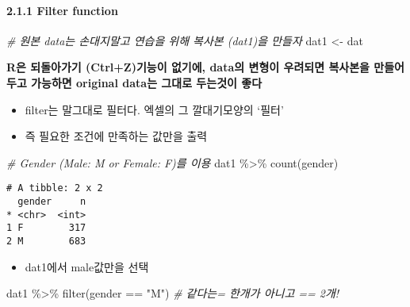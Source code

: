 \documentclass[
]{article}
\newenvironment{Shaded}{\begin{snugshade}}{\end{snugshade}}
\newcommand{\CommentTok}[1]{\textcolor[rgb]{0.56,0.35,0.01}{\textit{#1}}}
\newcommand{\FunctionTok}[1]{\textcolor[rgb]{0.00,0.00,0.00}{#1}}
\newcommand{\NormalTok}[1]{#1}
\newcommand{\OtherTok}[1]{\textcolor[rgb]{0.56,0.35,0.01}{#1}}
\newcommand{\SpecialCharTok}[1]{\textcolor[rgb]{0.00,0.00,0.00}{#1}}
\newcommand{\StringTok}[1]{\textcolor[rgb]{0.31,0.60,0.02}{#1}}
\providecommand{\tightlist}{%
  \setlength{\itemsep}{0pt}\setlength{\parskip}{0pt}}
\begin{document}
\hypertarget{filter-function}{%
\paragraph{2.1.1 Filter function}\label{filter-function}}

\begin{Shaded}
\begin{Highlighting}[]
\CommentTok{\# 원본 data는 손대지말고 연습을 위해 복사본 (dat1)을 만들자}
\NormalTok{dat1 }\OtherTok{\textless{}{-}}\NormalTok{ dat}
\end{Highlighting}
\end{Shaded}

\textbf{R은 되돌아가기 (Ctrl+Z)기능이 없기에, data의 변형이 우려되면
복사본을 만들어두고 가능하면 original data는 그대로 두는것이 좋다 }

\begin{itemize}
\tightlist
\item
  filter는 말그대로 필터다. 엑셀의 그 깔대기모양의 `필터'
\item
  즉 필요한 조건에 만족하는 값만을 출력
\end{itemize}

\begin{Shaded}
\begin{Highlighting}[]
\CommentTok{\# Gender (Male: M or Female: F)를 이용}
\NormalTok{dat1 }\SpecialCharTok{\%\textgreater{}\%} 
  \FunctionTok{count}\NormalTok{(gender)}
\end{Highlighting}
\end{Shaded}

\begin{verbatim}
# A tibble: 2 x 2
  gender     n
* <chr>  <int>
1 F        317
2 M        683
\end{verbatim}

\begin{itemize}
\tightlist
\item
  dat1에서 male값만을 선택
\end{itemize}

\begin{Shaded}
\begin{Highlighting}[]
\NormalTok{dat1 }\SpecialCharTok{\%\textgreater{}\%} 
   \FunctionTok{filter}\NormalTok{(gender }\SpecialCharTok{==} \StringTok{"M"}\NormalTok{) }\CommentTok{\# 같다는= 한개가 아니고 == 2개!}
\end{Highlighting}
\end{Shaded}
\end{document}

